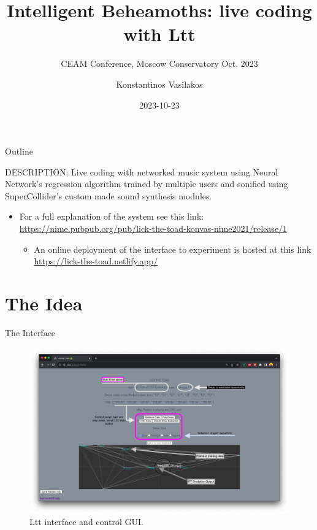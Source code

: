 \documentclass[t, 10pt, seahorse, bigger]{beamer}
\author{Konstantinos Vasilakos}
\date{2023-10-23}
\title{Intelligent Beheamoths: live coding with Ltt}
\subtitle{CEAM  Conference, Moscow Conservatory Oct. 2023}
\begin{document}
\maketitle
\begin{frame}{Outline}
\tableofcontents
\end{frame}

DESCRIPTION: Live coding with networked music system using Neural Network's regression algorithm trained by multiple users and sonified using SuperCollider's custom made sound synthesis modules.
\begin{itemize}
\item For a full explanation of the system see this link: \url{https://nime.pubpub.org/pub/lick-the-toad-konvas-nime2021/release/1}
\begin{itemize}
\item An online deployment of the interface to experiment is hosted at this link \url{https://lick-the-toad.netlify.app/}
\end{itemize}
\end{itemize}
\section{The Idea}
\label{sec:org95528d5}
\begin{frame}[label={sec:orgb34ed11}]{The Interface}
\begin{center}
\begin{figure}[htbp]
\centering
\includegraphics[width=.9\linewidth]{./screens/ltt-interface.png}
\caption{Ltt interface and control GUI.}
\end{figure}
\end{center}
\end{frame}
\end{document}
